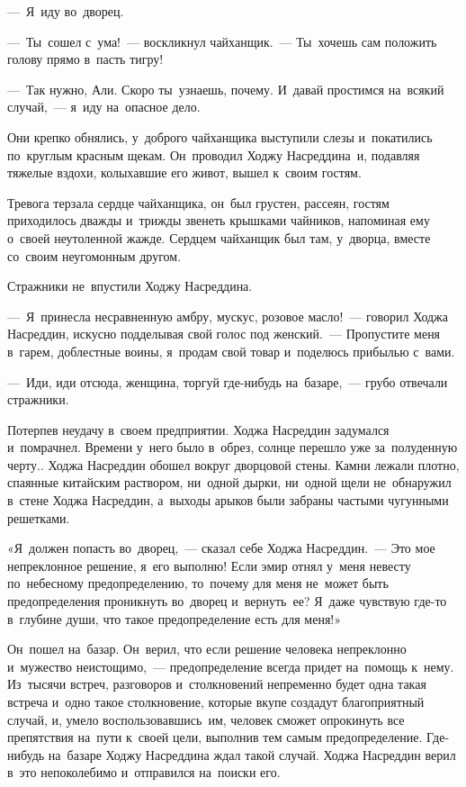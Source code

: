 \documentclass[12pt,a4paper]{book}
\begin{document}
—~Я~иду во~дворец.

—~Ты~сошел с~ума!~— воскликнул чайханщик.~— Ты~хочешь сам положить голову прямо в~пасть тигру!

—~Так нужно, Али. Скоро ты~узнаешь, почему. И~давай простимся на~всякий случай,~— я~иду на~опасное дело.

Они крепко обнялись, у~доброго чайханщика выступили слезы и~покатились по~круглым красным щекам. Он~проводил Ходжу Насреддина~и, подавляя тяжелые вздохи, колыхавшие его живот, вышел к~своим гостям.

Тревога терзала сердце чайханщика, он~был грустен, рассеян, гостям приходилось дважды и~трижды звенеть крышками чайников, напоминая ему о~своей неутоленной жажде. Сердцем чайханщик был там, у~дворца, вместе со~своим неугомонным другом.

Стражники не~впустили Ходжу Насреддина.

—~Я~принесла несравненную амбру, мускус, розовое масло!~— говорил Ходжа Насреддин, искусно подделывая свой голос под женский.~— Пропустите меня в~гарем, доблестные воины, я~продам свой товар и~поделюсь прибылью с~вами.

—~Иди, иди отсюда, женщина, торгуй где-нибудь на~базаре,~— грубо отвечали стражники.

Потерпев неудачу в~своем предприятии. Ходжа Насреддин задумался и~помрачнел. Времени у~него было в~обрез, солнце перешло уже за~полуденную черту.. Ходжа Насреддин обошел вокруг дворцовой стены. Камни лежали плотно, спаянные китайским раствором, ни~одной дырки, ни~одной щели не~обнаружил в~стене Ходжа Насреддин, а~выходы арыков были забраны частыми чугунными решетками.

«Я~должен попасть во~дворец,~— сказал себе Ходжа Насреддин.~— Это мое непреклонное решение, я~его выполню! Если эмир отнял у~меня невесту по~небесному предопределению, то~почему для меня не~может быть предопределения проникнуть во~дворец и~вернуть~ее? Я~даже чувствую где-то в~глубине души, что такое предопределение есть для меня!»

Он~пошел на~базар. Он~верил, что если решение человека непреклонно и~мужество неистощимо,~— предопределение всегда придет на~помощь к~нему. Из~тысячи встреч, разговоров и~столкновений непременно будет одна такая встреча и~одно такое столкновение, которые вкупе создадут благоприятный случай, и, умело воспользовавшись~им, человек сможет опрокинуть все препятствия на~пути к~своей цели, выполнив тем самым предопределение. Где-нибудь на~базаре Ходжу Насреддина ждал такой случай. Ходжа Насреддин верил в~это непоколебимо и~отправился на~поиски его.
\end{document}
